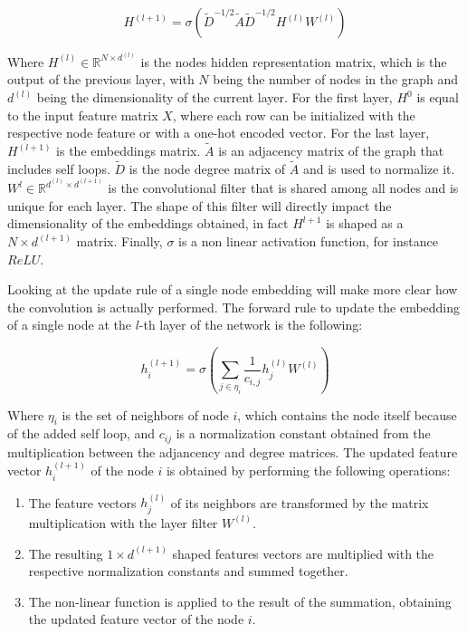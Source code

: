 \documentclass[%
    corpo=13.5pt,
    twoside,
    oldstyle,
    tipotesi=magistrale,
    greek,
    evenboxes
]{toptesi}
\begin{document}
\begin{equation} \label{gcn1}
H^{(l+1)}=\sigma(\tilde{D}^{-1/2}\tilde{A}\tilde{D}^{-1/2}H^{(l)}W^{(l)})
\end{equation}

Where $H^{(l)} \in\mathbb{R}^{N \times d^{(l)}}$ is the nodes hidden
representation matrix, which is the output of the previous layer, with $N$ being
the number of nodes in the graph and $d^{(l)}$ being the dimensionality of
the current layer. For the first
layer, $H^{0}$ is equal to the input feature matrix $X$, where each row can be
initialized with the respective node feature or with a one-hot encoded vector.
For the last layer, $H^{(l+1)}$ is the embeddings matrix.
$\tilde{A}$ is an adjacency matrix of the graph that includes self loops.
$\tilde{D}$ is the node degree matrix of $\tilde{A}$ and is used to
normalize it.
$W^{l}\in\mathbb{R}^{d^{(l)} \times d^{(l+1)}}$ is the convolutional filter that
is shared among all nodes and is unique for each layer.
The shape of this filter will directly impact the dimensionality of the
embeddings obtained, in fact $H^{l+1}$ is shaped as a $N\times d^{(l+1)}$ matrix.
Finally, $\sigma$ is a non linear activation function, for instance $ReLU$.

Looking at the update rule of a single node embedding will make more clear how
the convolution is actually performed.
The forward rule to update the embedding of a single node at the $l$-th layer
of the network is the following:

\begin{equation} \label{gcn2}
    h^{(l+1)}_{i}=\sigma(\sum_{j\in\eta_{i}} \frac{1}{c_{i,j}}h_j^{(l)}W^{{(l)}})
\end{equation}

Where $\eta_i$ is the set of neighbors of node $i$, which contains the node
itself because of the added self loop, and $c_{ij}$ is a
normalization constant obtained from the multiplication between the adjancency
and degree matrices.
The updated feature vector $h^{(l+1)}_{i}$ of the node $i$ is
obtained by performing the following operations:

\begin{enumerate}
    \item The feature vectors $h_j^{(l)}$ of its neighbors are transformed by
        the matrix multiplication with the layer filter $W^{(l)}$.
    \item The resulting $1 \times d^{(l+1)}$ shaped features vectors
        are multiplied with the respective normalization constants and summed
        together.
    \item The non-linear function is applied to the result of the summation,
        obtaining the updated feature vector of the node $i$.
\end{enumerate}
\end{document}
